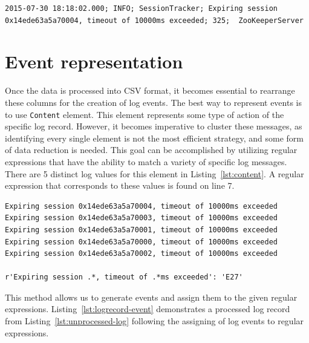 \begin{lstlisting}
2015-07-30 18:18:02.000; INFO; SessionTracker; Expiring session
0x14ede63a5a70004, timeout of 10000ms exceeded; 325;  ZooKeeperServer
\end{lstlisting}

\section{Event representation}
\label{sec:event}
Once the data is processed into CSV format, it becomes essential to rearrange these columns for the creation of log events. The best way to represent events is to use \texttt{Content} element. This element represents some type of action of the specific log record. However, it becomes imperative to cluster these messages, as identifying every single element is not the most efficient strategy, and some form of data reduction is needed. This goal can be accomplished by utilizing regular expressions that have the ability to match a variety of specific log messages. There are 5 distinct log values for this element in Listing~\ref{lst:content}. A regular expression that corresponds to these values is found on line 7.

\begin{lstlisting}
Expiring session 0x14ede63a5a70004, timeout of 10000ms exceeded
Expiring session 0x14ede63a5a70003, timeout of 10000ms exceeded
Expiring session 0x14ede63a5a70001, timeout of 10000ms exceeded
Expiring session 0x14ede63a5a70000, timeout of 10000ms exceeded
Expiring session 0x14ede63a5a70002, timeout of 10000ms exceeded

r'Expiring session .*, timeout of .*ms exceeded': 'E27'
\end{lstlisting}

This method allows us to generate events and assign them to the given regular expressions. Listing~\ref{lst:logrecord-event} demonstrates a processed log record from Listing~\ref{lst:unprocessed-log} following the assigning of log events to regular expressions.

